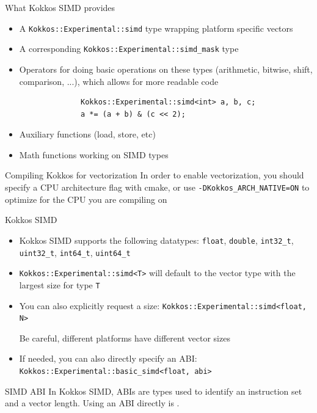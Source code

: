\documentclass[
    aspectratio=169,
    \createHandout
]{beamer}
\begin{document}
\begin{frame}[fragile]{What Kokkos SIMD provides}
    \begin{itemize}
        \item A \texttt{Kokkos::Experimental::simd} type wrapping platform specific vectors
        \item A corresponding \texttt{Kokkos::Experimental::simd\_mask} type
        \item Operators for doing basic operations on these types (arithmetic, bitwise, shift, comparison, ...), which allows for more readable code
          \begin{verbatim}
              Kokkos::Experimental::simd<int> a, b, c;
              a *= (a + b) & (c << 2);
          \end{verbatim}
        \item Auxiliary functions (load, store, etc)
        \item Math functions working on SIMD types
    \end{itemize}
    \begin{block}{Compiling Kokkos for vectorization}
        In order to enable vectorization, you should specify a CPU architecture flag with cmake, or use \texttt{-DKokkos\_ARCH\_NATIVE=ON} to optimize for the CPU you are compiling on
    \end{block}
\end{frame}

\begin{frame}[fragile]{Kokkos SIMD}
    \begin{itemize}
        \item Kokkos SIMD supports the following datatypes: \texttt{float}, \texttt{double}, \texttt{int32\_t}, \texttt{uint32\_t}, \texttt{int64\_t}, \texttt{uint64\_t}
        \item \texttt{Kokkos::Experimental::simd<T>} will default to the vector type with the largest size for type \texttt{T}
        \item You can also explicitly request a size: \texttt{Kokkos::Experimental::simd<float, N>}

        Be careful, different platforms have different vector sizes
        \item If needed, you can also directly specify an ABI: \texttt{Kokkos::Experimental::basic\_simd<float, abi>}
    \end{itemize}
    \begin{block}{SIMD ABI}
        In Kokkos SIMD, ABIs are types used to identify an instruction set and a vector length. Using an ABI directly is .
    \end{block}
\end{frame}
\end{document}
